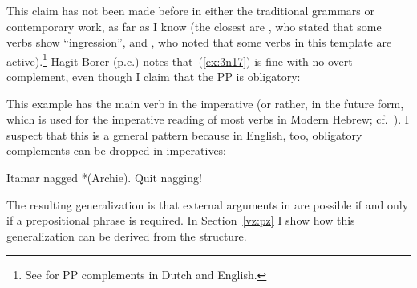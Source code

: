\begin{exe}
\begin{xlist}
\begin{xlist}
\begin{exe}
\begin{xlist}
\begin{xlist}
\begin{exe}
\begin{xlist}
\begin{xlist}
\begin{exe}
\begin{exe}
\begin{xlist}
\begin{exe}
\begin{exe}
\begin{xlist}
\begin{exe}
\begin{exe}
\begin{exe}
\begin{exe}
\begin{exe}
\begin{xlist}
\begin{exe}
\begin{xlist}
	
 \z
\z 

This claim has not been made before in either the traditional grammars or contemporary work, as far as I know (the closest are \citealt[87]{berman78}, who stated that some verbs show ``ingression'', and \citealt{schwarzwald08}, who noted that some verbs in this template are active).\footnote{See \cite{neeleman97} for PP complements in Dutch and English.} Hagit Borer (p.c.) notes that~(\ref{ex:3n17}) is fine with no overt complement, even though I claim that the PP is obligatory:
 \begin{exe}
	
 \z 

This example has the main verb in the imperative (or rather, in the future form, which is used for the imperative reading of most verbs in Modern Hebrew; cf.~\citealt{batel02lang}). I suspect that this is a general pattern because in English, too, obligatory complements can be dropped in imperatives:
 \begin{exe}
 \ex  
 \begin{xlist} 
 	\ex  Itamar nagged *(Archie). 
 	\ex  Quit nagging! 
 \z
\z 

The resulting generalization is that external arguments in {\tnif} are possible if and only if a prepositional phrase is required. In Section~\ref{vz:pz} I show how this generalization can be derived from the structure.


\end{xlist}
\end{exe}
\end{exe}
\end{xlist}
\end{exe}
\end{xlist}
\end{exe}
\end{exe}
\end{exe}
\end{exe}
\end{exe}
\end{xlist}
\end{exe}
\end{exe}
\end{xlist}
\end{exe}
\end{exe}
\end{xlist}
\end{xlist}
\end{exe}
\end{xlist}
\end{xlist}
\end{exe}
\end{xlist}
\end{xlist}
\end{exe}
